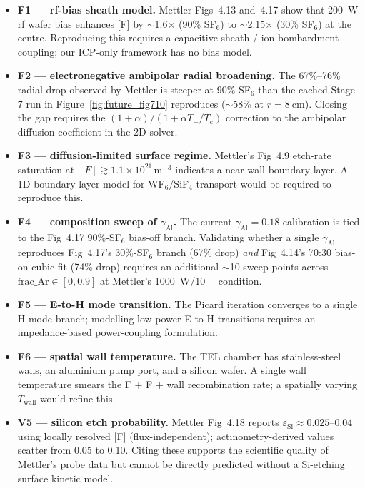 \documentclass[11pt,a4paper]{report}
\begin{document}
\begin{itemize}[nosep]
\item \textbf{F1 --- rf-bias sheath model.}  Mettler Figs~4.13 and~4.17 show that \SI{200}{\watt} rf wafer bias enhances [F] by $\sim$1.6$\times$ (90\% SF$_6$) to $\sim$2.15$\times$ (30\% SF$_6$) at the centre.  Reproducing this requires a capacitive-sheath / ion-bombardment coupling; our ICP-only framework has no bias model.

\item \textbf{F2 --- electronegative ambipolar radial broadening.}  The 67\%--76\% radial drop observed by Mettler is steeper at 90\%-SF$_6$ than the cached Stage-7 run in Figure~\ref{fig:future_fig710} reproduces ($\sim$58\% at $r = \SI{8}{\centi\meter}$).  Closing the gap requires the $(1+\alpha)/(1+\alpha T_-/T_e)$ correction to the ambipolar diffusion coefficient in the 2D solver.

\item \textbf{F3 --- diffusion-limited surface regime.}  Mettler's Fig~4.9 etch-rate saturation at $[F] \gtrsim 1.1\times10^{21}$\,m$^{-3}$ indicates a near-wall boundary layer.  A 1D boundary-layer model for WF$_6$/SiF$_4$ transport would be required to reproduce this.

\item \textbf{F4 --- composition sweep of $\gamma_\mathrm{Al}$.}  The current $\gamma_\mathrm{Al} = 0.18$ calibration is tied to the Fig~4.17 90\%-SF$_6$ bias-off branch.  Validating whether a single $\gamma_\mathrm{Al}$ reproduces Fig~4.17's 30\%-SF$_6$ branch (67\% drop) \emph{and} Fig~4.14's 70:30 bias-on cubic fit (74\% drop) requires an additional $\sim$10 sweep points across $\mathrm{frac\_Ar} \in [0, 0.9]$ at Mettler's \SI{1000}{\watt}/\SI{10}{\milli\torr} condition.

\item \textbf{F5 --- E-to-H mode transition.}  The Picard iteration converges to a single H-mode branch; modelling low-power E-to-H transitions requires an impedance-based power-coupling formulation.

\item \textbf{F6 --- spatial wall temperature.}  The TEL chamber has stainless-steel walls, an aluminium pump port, and a silicon wafer.  A single wall temperature smears the F + F + wall recombination rate; a spatially varying $T_{\mathrm{wall}}$ would refine this.

\item \textbf{V5 --- silicon etch probability.}  Mettler Fig~4.18 reports $\varepsilon_{\mathrm{Si}} \approx 0.025$--$0.04$ using locally resolved [F] (flux-independent); actinometry-derived values scatter from 0.05 to 0.10.  Citing these supports the scientific quality of Mettler's probe data but cannot be directly predicted without a Si-etching surface kinetic model.


\end{itemize}
\end{document}

